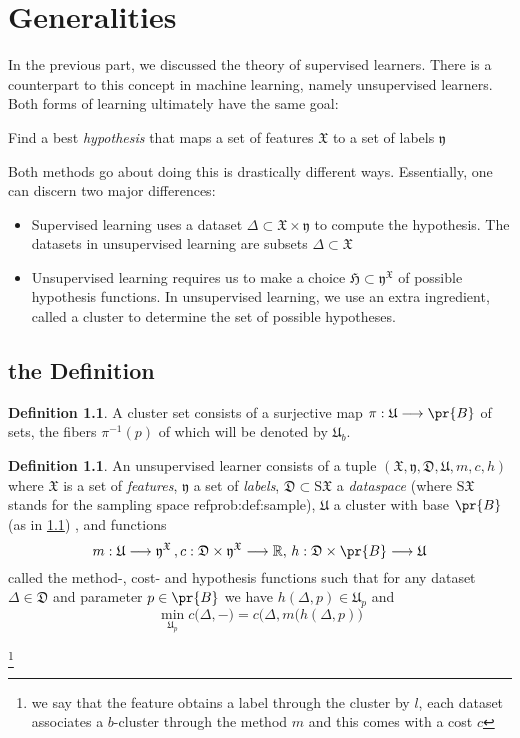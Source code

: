 \documentclass{book}
\theoremstyle{plain}
\theoremstyle{definition}
\newtheorem{definition}[corollary]{Definition}
\renewcommand{\d}[1]{\mathbb{#1}}
\newcommand{\f}[1]{\mathfrak{#1}}
\newcommand{\mor}{\longrightarrow}
\newcommand{\sample}[1]{\textrm{S} #1}
\begin{document}
\chapter{Generalities}

In the previous part, we discussed the theory of supervised learners. There is a counterpart to this concept in machine learning, namely unsupervised learners.\\
Both forms of learning ultimately have the same goal: 
\begin{center}
Find a best \emph{hypothesis} that maps a set of features $\f{X}$ to a set of labels $\f{y}$
\end{center}
Both methods go about doing this is drastically different ways. Essentially, one can discern two major differences:

\begin{itemize}
\item Supervised learning uses a dataset $\Delta\subset \f{X}\times \f{y}$ to compute the hypothesis. The datasets in unsupervised learning are subsets $\Delta\subset \f{X}$
\item Unsupervised learning requires us to make a choice $\f{H}\subset \f{y}^\f{X}$ of possible hypothesis functions. In unsupervised learning, we use an extra ingredient, called a cluster to determine the set of possible hypotheses.
\end{itemize}

\section{the Definition}

\begin{definition}\label{unsup:def:cluster}
A cluster set consists of a surjective map $\pi:\f{U}\mor \pr{B}$ of sets, the fibers $\pi^{-1}(p)$ of which will be denoted by $\f{U}_b$.
\end{definition}

\begin{definition}
An unsupervised learner consists of a tuple $(\f{X},\f{y}, \f{D},\f{U}, m,c,h)$ where $\f{X}$ is a set of \emph{features}, $\f{y}$ a set of \emph{labels},  $\f{D}\subset \sample\f{X}$ a \emph{dataspace} (where $\sample\f{X}$ stands for the sampling space ref{prob:def:sample}),   $\f{U}$ a cluster with base $\pr{B}$ (as in \ref{unsup:def:cluster}) , and functions
\[
m: \f{U}\mor \f{y}^\f{X}\, , c: \f{D}\times \f{y}^\f{X}\mor \d{R},\,  h: \f{D}\times \pr{B}\mor \f{U}
\]
called the method-, cost- and hypothesis functions such that for any dataset $\Delta \in \f{D}$ and parameter $p \in \pr{B}$ we have $h(\Delta,p)\in \f{U}_p$  and
\[
\min_{\f{U}_p} c\bigg(\Delta,-\bigg) = c\bigg(\Delta,m(h(\Delta,p)\bigg)
\]

\footnote{\noindent we say that the feature obtains a label through the cluster by $l$, each dataset associates a $b$-cluster through the method $m$ and this comes with a cost $c$} 
\end{definition}
\end{document}
